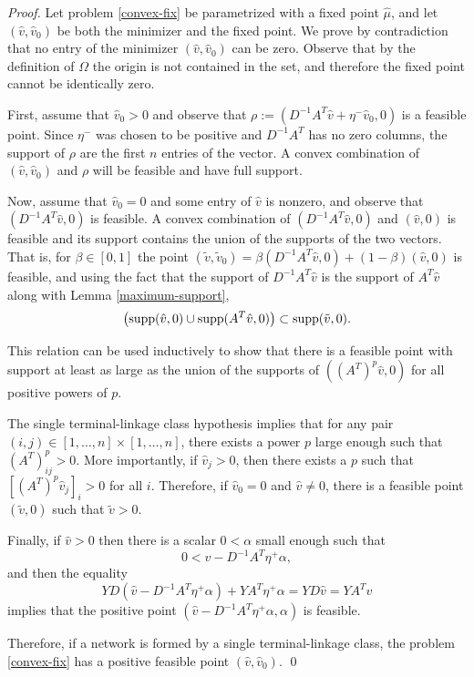 \documentclass[smallextended]{svjour3}       %
\newcommand*{\supp}{\mbox{\rm supp}}
\newcommand*{\0}{\mathbf{0}}
\newcommand*{\1}{\mathbf{1}}
\begin{document}
\begin{proof}
	Let problem \eqref{convex-fix} be parametrized with a fixed point $\hat\mu$,
	and let $(\hat v, \hat v_0)$ be both the minimizer and the fixed point.  We
	prove by contradiction that no entry of the minimizer $(\hat{v},\hat{v}_0)$
	can be zero. Observe that by the definition of $\Omega$ the origin is not
	contained in the set, and therefore the fixed point cannot be identically
	zero. 

	First, assume that $\hat{v}_0>0$ and observe that $\rho := (D^{-1}A^T\hat v + \eta^-\hat v_0, 0)$ is 
	a feasible point. Since $\eta^-$ was chosen to be positive and 
	$D^{-1}A^T$ has no zero columns, the support of $\rho$ are the first $n$ entries 
	of the vector. A convex combination of $(\hat v,\hat v_0)$ and $\rho$ will 
	be feasible and have full support.

	Now, assume that $\hat v_0 = 0$ and some entry of $\hat v$ is nonzero, and
	observe that $(D^{-1}A^T\hat{v},0)$ is feasible. A convex combination of
	$(D^{-1}A^T\hat{v},0)$ and $(\hat{v},0)$ is feasible and its support
	contains the union of the supports of the two vectors.  That is, for $\beta \in
	[0,1]$ the point  $(\tilde{v}, \tilde{v}_0) = \beta (D^{-1}A^T\hat{v},0) +
	(1-\beta)(\hat{v},0)$ is feasible, and using the fact that the support of
	$D^{-1}A^T\hat v$ is the support of $A^T	\hat v$ along with Lemma
	\ref{maximum-support},
	\begin{equation} 
		\left(\supp(\hat{v},0) \cup \supp(A^T\hat{v},0)\right) \subset \supp(\tilde{v},0).
	  \label{monotonesets} 
	\end{equation} 
	
	This relation can be used inductively to show that there is a feasible point
	with support at least as large as the union of the supports of
	$((A^T)^p\hat{v}, 0)$ for all positive powers of $p$.

	The single terminal-linkage class hypothesis implies that for any pair
	$(i,j)\in [1,\dots,n]\times [1,\dots,n]$, there exists a power $p$ large
	enough such that $(A^T)^p_{ij}>0$.  More importantly, if $\hat v_j > 0$, then
	there exists a $p$ such that $[(A^T)^p \hat v_j]_i > 0$ for all $i$.  
	Therefore, if $\hat{v}_0 = 0$ and $\hat{v} \neq 0$, there is a 
	feasible point $(\tilde{v},0)$ such that $\tilde{v} > 0$.  
	
	Finally, if $\hat v > 0$ then there is a scalar $0<\alpha$ small enough such
	that 
	\[
	0< \hat v - D^{-1}A^T\eta^+ \alpha,
	\]
	and then the equality  
	\[
		YD(\hat v - D^{-1}A^T\eta^+\alpha)+YA^T\eta^+\alpha = YD\hat v = YA^T\hat v
	\]
	implies that the positive point $(\hat v - D^{-1}A^T\eta^+\alpha,\alpha)$ is
	feasible.

	Therefore, if a network is formed by a single terminal-linkage class, the
	problem \eqref{convex-fix} has a positive feasible point $(\hat v, \hat
	v_0)$.  
   \qed
\end{proof}
\end{document}
